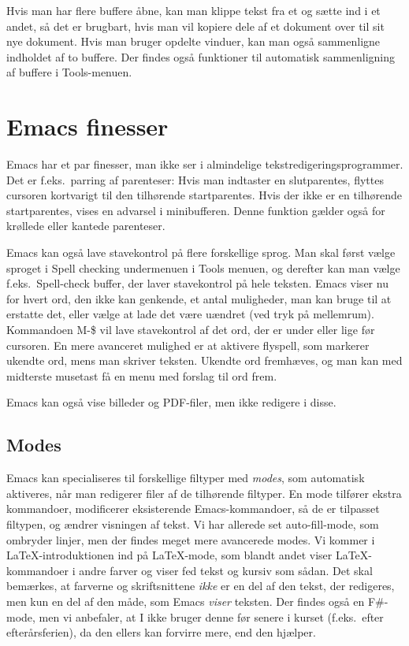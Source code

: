 \documentclass[a4paper]{article}
\begin{document}
Hvis man har flere buffere åbne, kan man klippe tekst fra et og sætte
ind i et andet, så det er brugbart, hvis man vil kopiere dele af et
dokument over til sit nye dokument.  Hvis man bruger opdelte vinduer,
kan man også sammenligne indholdet af to buffere.  Der findes også
funktioner til automatisk sammenligning af buffere i
\textsf{Tools}-menuen.

\section{Emacs finesser}

Emacs har et par finesser, man ikke ser i almindelige
tekstredigeringsprogrammer.  Det er f.eks.\ parring af parenteser:
Hvis man indtaster en slutparentes, flyttes cursoren kortvarigt til
den tilhørende startparentes.  Hvis der ikke er en tilhørende
startparentes, vises en advarsel i minibufferen.  Denne funktion
gælder også for krøllede eller kantede parenteser.

Emacs kan også lave stavekontrol på flere forskellige sprog.  Man skal
først vælge sproget i \textsf{Spell checking} undermenuen i
\textsf{Tools} menuen, og derefter kan man vælge
f.eks.\ \textsf{Spell-check buffer}, der laver stavekontrol på hele
teksten. Emacs viser nu for hvert ord, den ikke kan genkende, et antal
muligheder, man kan bruge til at erstatte det, eller vælge at lade det
være uændret (ved tryk på mellemrum).  Kommandoen \textsf{M-\$} vil
lave stavekontrol af det ord, der er under eller lige før cursoren.
En mere avanceret mulighed er at aktivere \textsf{flyspell}, som
markerer ukendte ord, mens man skriver teksten.  Ukendte ord
fremhæves, og man kan med midterste musetast få en menu med forslag
til ord frem.

Emacs kan også vise billeder og PDF-filer, men ikke redigere i disse.

\subsection{Modes}

Emacs kan specialiseres til forskellige filtyper med \emph{modes}, som
automatisk aktiveres, når man redigerer filer af de tilhørende
filtyper.  En mode tilfører ekstra kommandoer, modificerer
eksisterende Emacs-kommandoer, så de er tilpasset filtypen, og ændrer
visningen af tekst.  Vi har allerede set auto-fill-mode, som ombryder
linjer, men der findes meget mere avancerede modes.  Vi kommer i
\LaTeX-introduktionen ind på \LaTeX-mode, som blandt andet viser
\LaTeX-kommandoer i andre farver og viser fed tekst og kursiv som
sådan.  Det skal bemærkes, at farverne og skriftsnittene \emph{ikke}
er en del af den tekst, der redigeres, men kun en del af den måde, som
Emacs \emph{viser} teksten.  Der findes også en F\#-mode, men vi
anbefaler, at I ikke bruger denne før senere i kurset (f.eks.\ efter
efterårsferien), da den ellers kan forvirre mere, end den hjælper.
\end{document}
